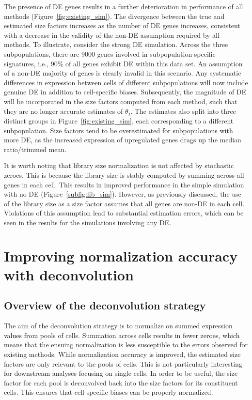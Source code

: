 \documentclass{article}
\begin{document}
The presence of DE genes results in a further deterioration in performance of all methods (Figure~\ref{fig:existing_sim}).
The divergence between the true and estimated size factors increases as the number of DE genes increases,
    consistent with a decrease in the validity of the non-DE assumption required by all methods.
To illustrate, consider the strong DE simulation.
Across the three subpopulations, there are 9000 genes involved in subpopulation-specific signatures, i.e., 90\% of all genes exhibit DE within this data set.
An assumption of a non-DE majority of genes is clearly invalid in this scenario.
Any systematic differences in expression between cells of different subpopulations will now include genuine DE in addition to cell-specific biases.
Subsequently, the magnitude of DE will be incorporated in the size factors computed from each method, such that they are no longer accurate estimates of $\theta_j$.
The estimates also split into three distinct groups in Figure~\ref{fig:existing_sim}, each corresponding to a different subpopulation.
Size factors tend to be overestimated for subpopulations with more DE, as the increased expression of upregulated genes drags up the median ratio/trimmed mean.

It is worth noting that library size normalization is not affected by stochastic zeroes.
This is because the library size is stably computed by summing across all genes in each cell.
This results in improved performance in the simple simulation with no DE (Figure~\ref{subfig:lib_sim}).
However, as previously discussed, the use of the library size as a size factor assumes that all genes are non-DE in each cell.
Violations of this assumption lead to substantial estimation errors, which can be seen in the results for the simulations involving any DE.

\section{Improving normalization accuracy with deconvolution}

\subsection{Overview of the deconvolution strategy}
The aim of the deconvolution strategy is to normalize on summed expression values from pools of cells.
Summation across cells results in fewer zeroes, which means that the ensuing normalization is less susceptible to the errors observed for existing methods.
While normalization accuracy is improved, the estimated size factors are only relevant to the pools of cells.
This is not particularly interesting for downstream analyses focusing on single cells.
In order to be useful, the size factor for each pool is deconvolved back into the size factors for its constituent cells.
This ensures that cell-specific biases can be properly normalized.
\end{document}
